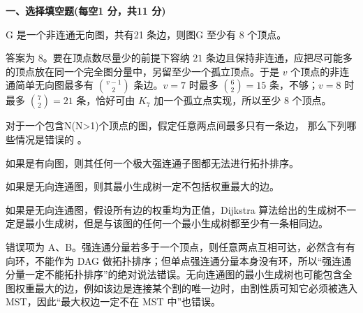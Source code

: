 

\textbf{一、选择填空题(每空1 分，共11 分)}
\begin{question}
G 是一个非连通无向图，共有21 条边，则图G 至少有  8  个顶点。
\begin{solution}
答案为 $8$。要在顶点数尽量少的前提下容纳 $21$ 条边且保持非连通，应把尽可能多的顶点放在同一个完全图分量中，另留至少一个孤立顶点。于是 $v$ 个顶点的非连通简单无向图最多有 $\binom{v-1}{2}$ 条边。$v=7$ 时最多 $\binom62=15$ 条，不够；$v=8$ 时最多 $\binom72=21$ 条，恰好可由 $K_7$ 加一个孤立点实现，所以至少 $8$ 个顶点。
\end{solution}
\end{question}

\begin{question}
对于一个包含N(N>1)个顶点的图，假定任意两点间最多只有一条边，
那么下列哪些情况是错误的 \blank\blank。
\begin{choiceoptions}[1]
\item 如果是有向图，则其任何一个极大强连通子图都无法进行拓扑排序。
\item 如果是无向连通图，则其最小生成树一定不包括权重最大的边。
\item 如果是无向连通图，假设所有边的权重均为正值，Dijkstra 算法给出的生成树不一定是最小生成树，但是与该图的任何一个最小生成树都至少有一条相同边。
\end{choiceoptions}
\begin{solution}
错误项为 A、B。强连通分量若多于一个顶点，则任意两点互相可达，必然含有有向环，不能作为 DAG 做拓扑排序；但单点强连通分量本身没有环，所以“强连通分量一定不能拓扑排序”的绝对说法错误。无向连通图的最小生成树也可能包含全图权重最大的边，例如该边是连接某个割的唯一边时，由割性质可知它必须被选入 MST，因此“最大权边一定不在 MST 中”也错误。
\end{solution}
\end{question}

